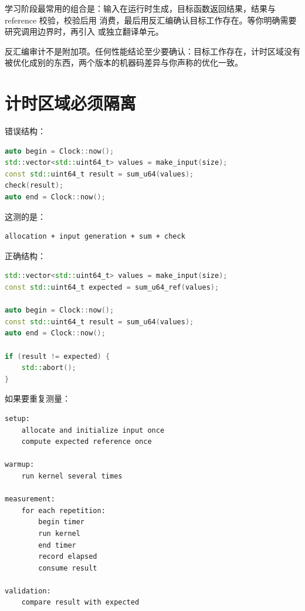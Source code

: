 学习阶段最常用的组合是：输入在运行时生成，目标函数返回结果，结果与 reference 校验，校验后用  消费，最后用反汇编确认目标工作存在。等你明确需要研究调用边界时，再引入  或独立翻译单元。

\begin{warningbox}
反汇编审计不是附加项。任何性能结论至少要确认：目标工作存在，计时区域没有被优化成别的东西，两个版本的机器码差异与你声称的优化一致。
\end{warningbox}

\section{计时区域必须隔离}

错误结构：

\begin{lstlisting}[language=C++]
auto begin = Clock::now();
std::vector<std::uint64_t> values = make_input(size);
const std::uint64_t result = sum_u64(values);
check(result);
auto end = Clock::now();
\end{lstlisting}

这测的是：

\begin{lstlisting}
allocation + input generation + sum + check
\end{lstlisting}

正确结构：

\begin{lstlisting}[language=C++]
std::vector<std::uint64_t> values = make_input(size);
const std::uint64_t expected = sum_u64_ref(values);

auto begin = Clock::now();
const std::uint64_t result = sum_u64(values);
auto end = Clock::now();

if (result != expected) {
    std::abort();
}
\end{lstlisting}

如果要重复测量：

\begin{lstlisting}
setup:
    allocate and initialize input once
    compute expected reference once

warmup:
    run kernel several times

measurement:
    for each repetition:
        begin timer
        run kernel
        end timer
        record elapsed
        consume result

validation:
    compare result with expected
\end{lstlisting}

